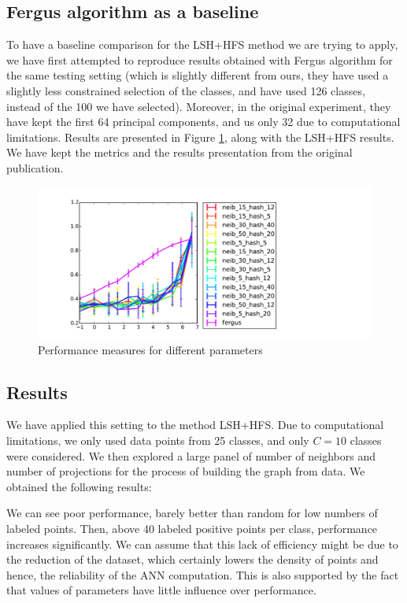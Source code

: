 \documentclass{article} %
\begin{document}
\subsection{Fergus algorithm as a baseline}
To have a baseline comparison for the LSH+HFS method we are trying to apply, we have first attempted to reproduce results obtained with Fergus algorithm for the same testing setting (which is slightly different from ours, they have used a slightly less constrained selection of the classes, and have used 126 classes, instead of the 100 we have selected). Moreover, in the original experiment, they have kept the first 64 principal components, and us only 32 due 
to computational limitations. Results are presented in Figure \ref{variation}, along with the LSH+HFS results. We have kept the metrics and the results presentation from the original publication.

\begin{figure}[!h]
  \hspace{-3cm}
  \includegraphics[width=1.8\textwidth]{figures/method_comp.pdf}
  \caption{Performance measures for different parameters}
  \label{variation}
\end{figure}

\subsection{Results}
We have applied this setting to the method LSH+HFS. Due to computational limitations, we only used data points from 25 classes, and only $C=10$ classes were considered. We then explored a large panel of number of neighbors and number of projections for the process of building the graph from data. We obtained the following results:



We can see poor performance, barely better than random for low numbers of labeled points. Then, above 40 labeled positive points per class, performance increases significantly. We can assume that this lack of efficiency might be due to the reduction of the dataset, which certainly lowers the density of points and hence, the reliability of the ANN computation. This is also supported by the fact that values of parameters have little influence over performance. 
\end{document}
